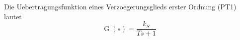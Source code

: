 Die Uebertragungsfunktion eines Verzoegerungsglieds erster Ordnung (PT1) lautet
$$\operatorname{G}(s) = \frac{k_S}{T s + 1}$$
